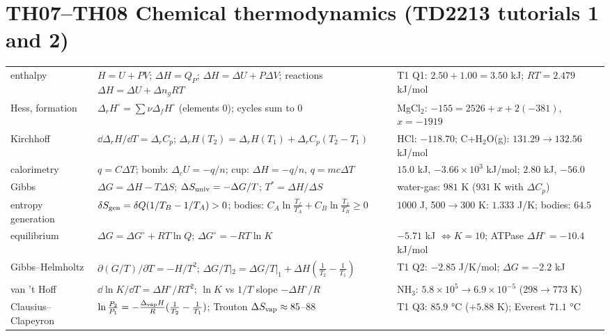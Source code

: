 \documentclass[9pt]{article}
\begin{document}
\section*{TH07--TH08 Chemical thermodynamics (TD2213 tutorials 1 and 2)}
\begin{tabular}{@{}p{2.9cm}p{8.4cm}p{6.1cm}@{}}
\toprule
enthalpy & $H=U+PV$; $\Delta H=Q_P$; $\Delta H=\Delta U+P\Delta V$; reactions $\Delta H=\Delta U+\Delta n_gRT$ & T1 Q1: $2.50+1.00=3.50$ kJ; $RT=2.479$ kJ/mol\\
Hess, formation & $\Delta_rH^\circ=\sum\nu\Delta_fH^\circ$ (elements $0$); cycles sum to $0$ & MgCl$_2$: $-155=2526+x+2(-381)$, $x=-1919$\\
Kirchhoff & $\dd\Delta_rH/\dd T=\Delta_rC_p$; $\Delta_rH(T_2)=\Delta_rH(T_1)+\Delta_rC_p(T_2-T_1)$ & HCl: $-118.70$; C+H$_2$O(g): $131.29\to132.56$ kJ/mol\\
calorimetry & $q=C\Delta T$; bomb: $\Delta_cU=-q/n$; cup: $\Delta H=-q/n$, $q=mc\Delta T$ & $15.0$ kJ, $-3.66\times10^3$ kJ/mol; $2.80$ kJ, $-56.0$\\
Gibbs & $\Delta G=\Delta H-T\Delta S$; $\Delta S_{\rm univ}=-\Delta G/T$; $T^*=\Delta H/\Delta S$ & water-gas: $981$ K ($931$ K with $\Delta C_p$)\\
entropy generation & $\delta S_{\rm gen}=\delta Q(1/T_B-1/T_A)>0$; bodies: $C_A\ln\frac{T_f}{T_A}+C_B\ln\frac{T_f}{T_B}\ge0$ & $1000$ J, 500$\to$300 K: $1.333$ J/K; bodies: $64.5$\\
equilibrium & $\Delta G=\Delta G^\circ+RT\ln Q$; $\Delta G^\circ=-RT\ln K$ & $-5.71$ kJ $\Leftrightarrow K=10$; ATPase $\Delta H^\circ=-10.4$ kJ/mol\\
Gibbs--Helmholtz & $\partial(G/T)/\partial T=-H/T^2$; $\Delta G/T|_2=\Delta G/T|_1+\Delta H(\tfrac1{T_2}-\tfrac1{T_1})$ & T1 Q2: $-2.85$ J/K/mol; $\Delta G=-2.2$ kJ\\
van 't Hoff & $\dd\ln K/\dd T=\Delta H^\circ/RT^2$; $\ln K$ vs $1/T$ slope $-\Delta H^\circ/R$ & NH$_3$: $5.8\times10^5\to6.9\times10^{-5}$ (298$\to$773 K)\\
Clausius--Clapeyron & $\ln\frac{P_2}{P_1}=-\frac{\Delta_{\rm vap}H}{R}(\frac1{T_2}-\frac1{T_1})$; Trouton $\Delta S_{\rm vap}\approx85$--$88$ & T1 Q3: $85.9$ °C ($+5.88$ K); Everest $71.1$ °C\\
\bottomrule
\end{tabular}
\end{document}
